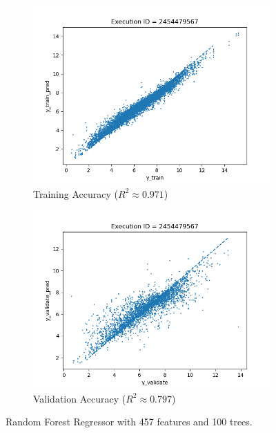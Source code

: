 \documentclass[11pt]{article}
\begin{document}
\begin{figure}
     \centering
     \begin{subfigure}[b]{0.45\textwidth}
         \centering
         \includegraphics[scale=0.45]{images/accuracy_train_rfr}
         \caption{Training Accuracy ($R^2 \approx 0.971$)}
        \label{fig:TrainingAccuracyRFM}
     \end{subfigure}
     \hfill
     \begin{subfigure}[b]{0.45\textwidth}
         \centering
         \includegraphics[scale=0.45]{images/accuracy_validate_rfr}
        \caption{Validation Accuracy ($R^2 \approx 0.797$)}
        \label{fig:ValidationAccuracyRFM}
     \end{subfigure}
     \caption{Random Forest Regressor with 457 features and 100 trees.}
     \label{fig:RFMModel}
\end{figure}
\end{document}
